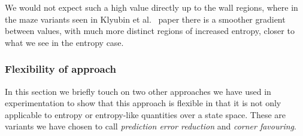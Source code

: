 \documentclass{article}
\begin{document}
We would not expect such a high value directly up to the wall regions, where in the maze variants seen in Klyubin et al.~\citep{klyubin2005empowerment} paper there is a smoother gradient between values, with much more distinct regions of increased entropy, closer to what we see in the entropy case.

\subsubsection{Flexibility of approach}
In this section we briefly touch on two other approaches we have used in experimentation to show that this approach is flexible in that it is not only applicable to entropy or entropy-like quantities over a state space. These are variants we have chosen to call \emph{prediction error reduction} and \emph{corner favouring}.
\end{document}
